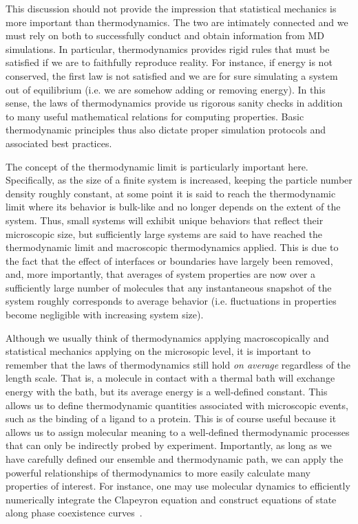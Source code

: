 \documentclass[9pt,bestpractices]{livecoms}
\begin{document}
This discussion should not provide the impression that statistical mechanics is more important than thermodynamics.
The two are intimately connected and we must rely on both to successfully conduct and obtain information from MD simulations.
In particular, thermodynamics provides rigid rules that must be satisfied if we are to faithfully reproduce reality.
For instance, if energy is not conserved, the first law is not satisfied and we are for sure simulating a system out of equilibrium (i.e. we are somehow adding or removing energy).
In this sense, the laws of thermodynamics provide us rigorous sanity checks in addition to many useful mathematical relations for computing properties.
Basic thermodynamic principles thus also dictate proper simulation protocols and associated best practices.

The concept of the thermodynamic limit is particularly important here.
Specifically, as the size of a finite system is increased, keeping the particle number density roughly constant, at some point it is said to reach the thermodynamic limit where its behavior is bulk-like and no longer depends on the extent of the system.
Thus, small systems will exhibit unique behaviors that reflect their microscopic size, but sufficiently large systems are said to have reached the thermodynamic limit and macroscopic thermodynamics applied.
This is due to the fact that the effect of interfaces or boundaries have largely been removed, and, more importantly, that averages of system properties are now over a sufficiently large number of molecules that any instantaneous snapshot of the system roughly corresponds to average behavior (i.e. fluctuations in properties become negligible with increasing system size).

Although we usually think of thermodynamics applying macroscopically and statistical mechanics applying on the microsopic level, it is important to remember that the laws of thermodynamics still hold \textit{on average} regardless of the length scale.
That is, a molecule in contact with a thermal bath will exchange energy with the bath, but its average energy is a well-defined constant.
This allows us to define thermodynamic quantities associated with microscopic events, such as the binding of a ligand to a protein.
This is of course useful because it allows us to assign molecular meaning to a well-defined thermodynamic processes that can only be indirectly probed by experiment.
Importantly, as long as we have carefully defined our ensemble and thermodynamic path, we can apply the powerful relationships of thermodynamics to more easily calculate many properties of interest.
For instance, one may use molecular dynamics to efficiently numerically integrate the Clapeyron equation and construct equations of state along phase coexistence curves~\cite{Kofke1993, GonzalezSalgado2010}.
\end{document}
